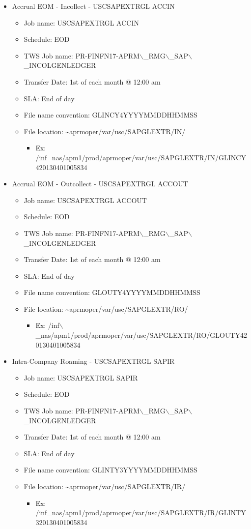 \documentclass[12pt,twoside]{article}
\begin{document}
\begin{itemize}
\item Accrual EOM - Incollect - USCSAPEXTRGL ACCIN
\begin{itemize}
\item Job name: USCSAPEXTRGL ACCIN
\item Schedule: EOD
\item TWS Job name: PR-FINFN17-APRM$\backslash$\_RMG$\backslash$\_SAP$\backslash$\_INCOLGENLEDGER
\item Transfer Date: 1st of each month @ 12:00 am
\item SLA: End of day
\item File name convention: GLINCY4YYYYMMDDHHMMSS
\item File location: \textasciitilde{}aprmoper/var/usc/SAPGLEXTR/IN/
\begin{itemize}
\item Ex: /inf\_nas/apm1/prod/aprmoper/var/usc/SAPGLEXTR/IN/GLINCY420130401005834
\end{itemize}
\end{itemize}

\item Accrual EOM - Outcollect - USCSAPEXTRGL ACCOUT
\begin{itemize}
\item Job name: USCSAPEXTRGL ACCOUT
\item Schedule: EOD
\item TWS Job name: PR-FINFN17-APRM$\backslash$\_RMG$\backslash$\_SAP$\backslash$\_INCOLGENLEDGER
\item Transfer Date: 1st of each month @ 12:00 am
\item SLA: End of day
\item File name convention: GLOUTY4YYYYMMDDHHMMSS
\item File location: \textasciitilde{}aprmoper/var/usc/SAPGLEXTR/RO/
\begin{itemize}
\item Ex:  /inf$\backslash$\_nas/apm1/prod/aprmoper/var/usc/SAPGLEXTR/RO/GLOUTY420130401005834
\end{itemize}
\end{itemize}

\item Intra-Company Roaming - USCSAPEXTRGL SAPIR
\begin{itemize}
\item Job name: USCSAPEXTRGL SAPIR
\item Schedule: EOD
\item TWS Job name: PR-FINFN17-APRM$\backslash$\_RMG$\backslash$\_SAP$\backslash$\_INCOLGENLEDGER
\item Transfer Date: 1st of each month @ 12:00 am
\item SLA: End of day
\item File name convention: GLINTY3YYYYMMDDHHMMSS
\item File location: \textasciitilde{}aprmoper/var/usc/SAPGLEXTR/IR/
\begin{itemize}
\item Ex:  /inf\_nas/apm1/prod/aprmoper/var/usc/SAPGLEXTR/IR/GLINTY320130401005834
\end{itemize}
\end{itemize}
\end{itemize}
\normalsize
\end{document}
